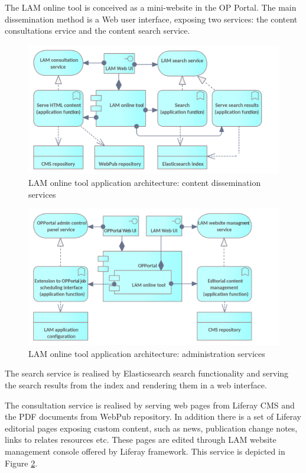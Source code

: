 	
	The LAM online tool is conceived as a mini-website in the OP Portal. The main dissemination method is a Web user interface, exposing two services: the content consultations ervice and the content search service. 
	
    \begin{figure}[!h]
	\centering
	\includegraphics[width=.78\textwidth]{images/application/Online tool - dissemination.png}
	\caption{LAM online tool application architecture: content dissemination services}
	\label{fig:app-online-tool-dissemination}
	\end{figure}
		

    \begin{figure}[!h]
	\centering
	\includegraphics[width=.67\textwidth]{images/application/Online tool - management.png}
	\caption{LAM online tool application architecture: administration services}
	\label{fig:app-online-tool-management}
	\end{figure}

	The search service is realised by Elasticsearch search functionality and serving the search results from the index and rendering them in a web interface. 
	
	The consultation service is realised by serving web pages from Liferay CMS and the PDF documents from WebPub repository. In addition there is a set of Liferay editorial pages exposing custom content, such as news, publication change notes, links to relates resources etc. These pages are edited through LAM website management console offered by Liferay framework. This service is depicted in Figure \ref{fig:app-online-tool-management}. 
	
